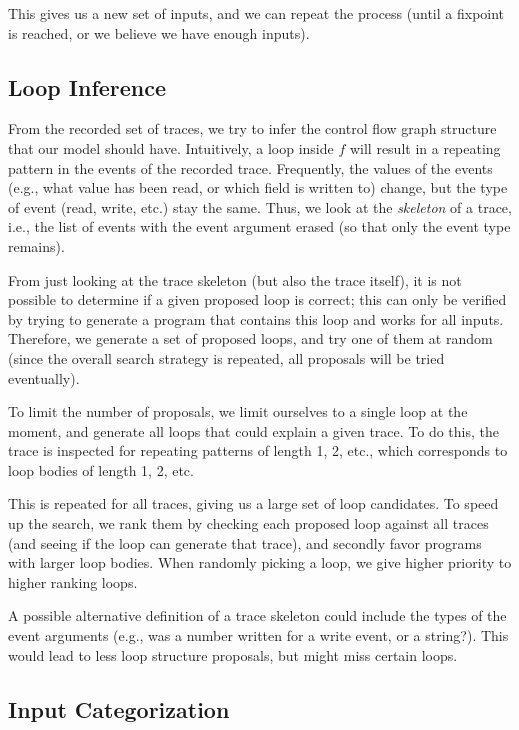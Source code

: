 \documentclass[]{article}
\begin{document}
This gives us a new set of inputs, and we can repeat the process (until a
fixpoint is reached, or we believe we have enough inputs).


\subsection{Loop Inference}

From the recorded set of traces, we try to infer the control flow graph
structure that our model should have.
Intuitively, a loop inside $f$ will result in a repeating pattern in the
events of the recorded trace.  Frequently, the values of the events (e.g.,
what value has been read, or which field is written to) change, but
the type of event (read, write, etc.) stay the same.  Thus, we
look at the \textit{skeleton} of a trace, i.e., the list of events with
the event argument erased (so that only the event type remains).

From just looking at the trace skeleton (but also the trace itself), it
is not possible to determine if a given proposed loop is correct;  this
can only be verified by trying to generate a program that contains this
loop and works for all inputs.
Therefore, we generate a set of proposed loops, and try one of them at
random (since the overall search strategy is repeated, all proposals
will be tried eventually).

To limit the number of proposals, we limit ourselves to a single loop at
the moment, and generate all loops that could explain a given trace.  To
do this, the trace is inspected for repeating patterns of length 1, 2, etc.,
which corresponds to loop bodies of length 1, 2, etc.

This is repeated for all traces, giving us a large set of loop candidates.
To speed up the search, we rank them by checking each proposed loop against
all traces (and seeing if the loop can generate that trace), and secondly
favor programs with larger loop bodies.  When randomly picking a
loop, we give higher priority to higher ranking loops.

A possible alternative definition of a trace skeleton could include the
types of the event arguments (e.g., was a number written for a write event,
or a string?).  This would lead to less loop structure proposals, but might
miss certain loops.


\subsection{Input Categorization}
\end{document}
